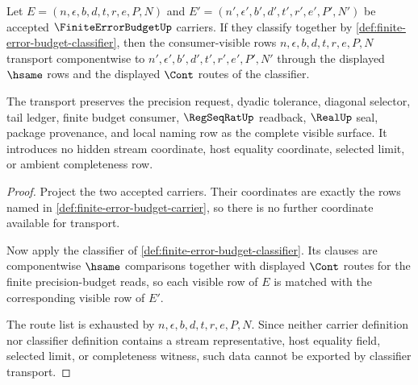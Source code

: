 \begin{theorem}
\label{thm:finite-error-budget-classifier-stability}
Let $E=(n,\epsilon,b,d,t,r,e,P,N)$ and
$E'=(n',\epsilon',b',d',t',r',e',P',N')$ be accepted
$\FiniteErrorBudgetUp$ carriers. If they classify together by
\autoref{def:finite-error-budget-classifier}, then the consumer-visible rows
$n,\epsilon,b,d,t,r,e,P,N$ transport componentwise to
$n',\epsilon',b',d',t',r',e',P',N'$ through the displayed $\hsame$ rows and the
displayed $\Cont$ routes of the classifier.

The transport preserves the precision request, dyadic tolerance, diagonal
selector, tail ledger, finite budget consumer, $\RegSeqRatUp$ readback,
$\RealUp$ seal, package provenance, and local naming row as the complete
visible surface. It introduces no hidden stream coordinate, host equality
coordinate, selected limit, or ambient completeness row.
\end{theorem}
\begin{proof}
Project the two accepted carriers. Their coordinates are exactly the rows named
in \autoref{def:finite-error-budget-carrier}, so there is no further coordinate
available for transport.

Now apply the classifier of
\autoref{def:finite-error-budget-classifier}. Its clauses are componentwise
$\hsame$ comparisons together with displayed $\Cont$ routes for the finite
precision-budget reads, so each visible row of $E$ is matched with the
corresponding visible row of $E'$.

The route list is exhausted by
$n,\epsilon,b,d,t,r,e,P,N$. Since neither carrier definition nor classifier
definition contains a stream representative, host equality field, selected
limit, or completeness witness, such data cannot be exported by classifier
transport.
\end{proof}

